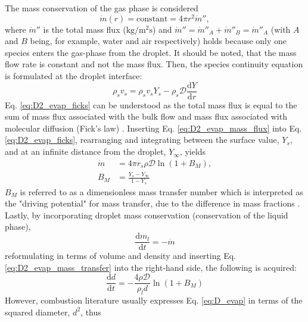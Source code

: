 \documentclass[12pt]{article}
\numberwithin{equation}{section}
\begin{document}
The mass conservation of the gas phase is considered
\begin{equation}\label{eq:D2_evap_mass_flux}
    \dot m(r)=\mathrm{constant}=4\pi r^{2}\dot m'',
\end{equation}
where $\dot m''$ is the total mass flux ($\mathrm{kg/m^{2}s}$) and $\dot m''=\dot m''_{A}+\dot m''_{B}=\dot m''_{A}$ (with $A$ and $B$ being, for example, water and air respectively) holds because only one species enters the gas-phase from the droplet. It should be noted, that the mass flow rate is constant and not the mass flux. Then, the species continuity equation is formulated at the droplet interface:
\begin{equation}\label{eq:D2_evap_ficks}
    \rho_{s}v_{s}= \rho_{s}v_{s}Y_{s}-\rho_{s}\mathcal{D}\frac{\mathrm{d}Y}{\mathrm{d}r} 
\end{equation}
Eq. \ref{eq:D2_evap_ficks} can be understood as the total mass flux is equal to the sum of mass flux associated with the bulk flow and mass flux associated with molecular diffusion (Fick's law) \cite{turns2011introduction}. Inserting Eq. \ref{eq:D2_evap_mass_flux} into Eq. \ref{eq:D2_evap_ficks}, rearranging and integrating between the surface value, $Y_{s}$, and at an infinite distance from the droplet, $Y_{\infty}$, yields
\begin{equation}\label{eq:D2_evap_mass_transfer}
    \begin{aligned}
        \dot m&=4\pi r_{s}\rho \mathcal{D}\ln(1+B_{M}),\\
        B_{M}&=\frac{Y_{s}-Y_{\infty}}{1-Y_{s}}    
    \end{aligned}
\end{equation}
$B_{M}$ is referred to as a dimensionless mass transfer number which is interpreted as the "driving potential" for mass transfer, due to the difference in mass fractions \cite{turns2011introduction}. Lastly, by incorporating droplet mass conservation (conservation of the liquid phase),
\begin{equation}
    \frac{\mathrm{d}m_{l}}{\mathrm{d}t}=-\dot m
\end{equation}
reformulating in terms of volume and density and inserting Eq. \ref{eq:D2_evap_mass_transfer} into the right-hand side, the following is acquired:
\begin{equation}\label{eq:D_evap}
    \frac{\mathrm{d}d}{\mathrm{d}t}=-\frac{4\rho\mathcal{D}}{\rho_{l}d}\ln(1+B_{M})
\end{equation}
However, combustion literature usually expresses Eq. \ref{eq:D_evap} in terms of the squared diameter, $d^{2}$, thus 
\end{document}
